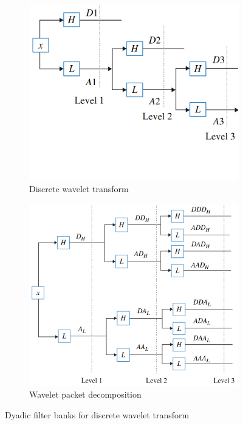 \begin{figure}[ht]
    \centering
    \begin{subfigure}[b]{0.49\textwidth}
        \includegraphics[width=\textwidth]{assets/analysis/DWT.png}
        \caption{Discrete wavelet transform}
        \label{fig:dwt-filter-bank}
    \end{subfigure}
    \hfill
    \begin{subfigure}[b]{0.49\textwidth}
        \includegraphics[width=\textwidth]{assets/analysis/WPD.png}
        \caption{Wavelet packet decomposition}
        \label{fig:wpd-filter-bank}
    \end{subfigure}
    \caption{Dyadic filter banks for discrete wavelet transform~\cite{nandi_condition_2019}}
\end{figure}

